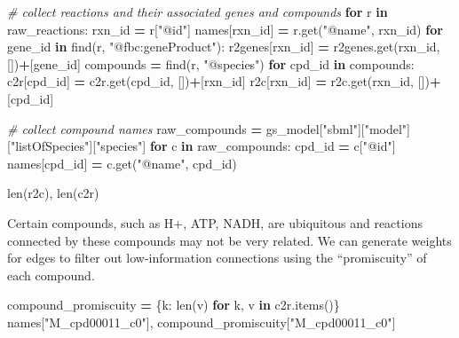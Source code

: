 \documentclass[
]{book}
\newenvironment{Shaded}{\begin{snugshade}}{\end{snugshade}}
\newcommand{\BuiltInTok}[1]{#1}
\newcommand{\CommentTok}[1]{\textcolor[rgb]{0.56,0.35,0.01}{\textit{#1}}}
\newcommand{\ControlFlowTok}[1]{\textcolor[rgb]{0.13,0.29,0.53}{\textbf{#1}}}
\newcommand{\KeywordTok}[1]{\textcolor[rgb]{0.13,0.29,0.53}{\textbf{#1}}}
\newcommand{\NormalTok}[1]{#1}
\newcommand{\OperatorTok}[1]{\textcolor[rgb]{0.81,0.36,0.00}{\textbf{#1}}}
\newcommand{\StringTok}[1]{\textcolor[rgb]{0.31,0.60,0.02}{#1}}
\begin{document}
\begin{Shaded}
\begin{Highlighting}[numbers=left,,]
\CommentTok{\# collect reactions and their associated genes and compounds}
\ControlFlowTok{for}\NormalTok{ r }\KeywordTok{in}\NormalTok{ raw\_reactions:}
\NormalTok{    rxn\_id }\OperatorTok{=}\NormalTok{ r[}\StringTok{"@id"}\NormalTok{]}
\NormalTok{    names[rxn\_id] }\OperatorTok{=}\NormalTok{ r.get(}\StringTok{"@name"}\NormalTok{, rxn\_id)}
    \ControlFlowTok{for}\NormalTok{ gene\_id }\KeywordTok{in}\NormalTok{ find(r, }\StringTok{"@fbc:geneProduct"}\NormalTok{):}
\NormalTok{        r2genes[rxn\_id] }\OperatorTok{=}\NormalTok{ r2genes.get(rxn\_id, [])}\OperatorTok{+}\NormalTok{[gene\_id]}
\NormalTok{    compounds }\OperatorTok{=}\NormalTok{ find(r, }\StringTok{"@species"}\NormalTok{)}
    \ControlFlowTok{for}\NormalTok{ cpd\_id }\KeywordTok{in}\NormalTok{ compounds:}
\NormalTok{        c2r[cpd\_id] }\OperatorTok{=}\NormalTok{ c2r.get(cpd\_id, [])}\OperatorTok{+}\NormalTok{[rxn\_id]}
\NormalTok{        r2c[rxn\_id] }\OperatorTok{=}\NormalTok{ r2c.get(rxn\_id, [])}\OperatorTok{+}\NormalTok{[cpd\_id]}

\CommentTok{\# collect compound names}
\NormalTok{raw\_compounds }\OperatorTok{=}\NormalTok{ gs\_model[}\StringTok{"sbml"}\NormalTok{][}\StringTok{"model"}\NormalTok{][}\StringTok{"listOfSpecies"}\NormalTok{][}\StringTok{"species"}\NormalTok{]}
\ControlFlowTok{for}\NormalTok{ c }\KeywordTok{in}\NormalTok{ raw\_compounds:}
\NormalTok{    cpd\_id }\OperatorTok{=}\NormalTok{ c[}\StringTok{"@id"}\NormalTok{]}
\NormalTok{    names[cpd\_id] }\OperatorTok{=}\NormalTok{ c.get(}\StringTok{"@name"}\NormalTok{, cpd\_id)}

\BuiltInTok{len}\NormalTok{(r2c), }\BuiltInTok{len}\NormalTok{(c2r)}
\end{Highlighting}
\end{Shaded}

Certain compounds, such as H+, ATP, NADH, are ubiquitous and reactions connected by these compounds may not be very related.
We can generate weights for edges to filter out low-information connections using the ``promiscuity'' of each compound.

\begin{Shaded}
\begin{Highlighting}[numbers=left,,]
\NormalTok{compound\_promiscuity }\OperatorTok{=}\NormalTok{ \{k: }\BuiltInTok{len}\NormalTok{(v) }\ControlFlowTok{for}\NormalTok{ k, v }\KeywordTok{in}\NormalTok{ c2r.items()\}}
\NormalTok{names[}\StringTok{"M\_cpd00011\_c0"}\NormalTok{], compound\_promiscuity[}\StringTok{"M\_cpd00011\_c0"}\NormalTok{]}
\end{Highlighting}
\end{Shaded}
\end{document}
